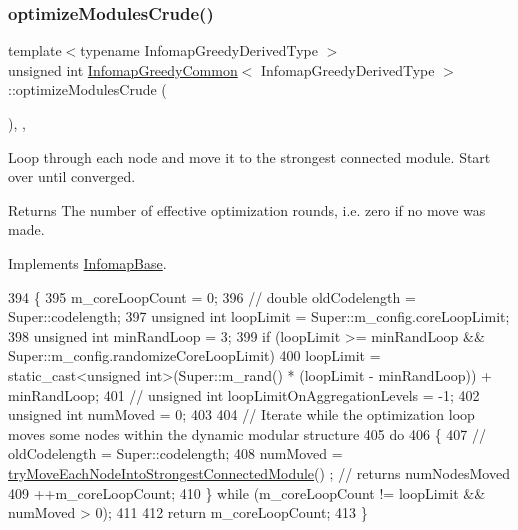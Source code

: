 \subsubsection{\texorpdfstring{optimize\+Modules\+Crude()}{optimizeModulesCrude()}}
{\footnotesize\ttfamily template$<$typename Infomap\+Greedy\+Derived\+Type $>$ \\
unsigned int \mbox{\hyperlink{classInfomapGreedyCommon}{Infomap\+Greedy\+Common}}$<$ Infomap\+Greedy\+Derived\+Type $>$\+::optimize\+Modules\+Crude (\begin{DoxyParamCaption}{ }\end{DoxyParamCaption})\hspace{0.3cm}{\ttfamily [inline]}, {\ttfamily [protected]}, {\ttfamily [virtual]}}

Loop through each node and move it to the strongest connected module. Start over until converged.

\begin{DoxyReturn}{Returns}
The number of effective optimization rounds, i.\+e. zero if no move was made. 
\end{DoxyReturn}


Implements \mbox{\hyperlink{classInfomapBase_acb6dc935567c31d7ada4b514c5b8dcea}{Infomap\+Base}}.


\begin{DoxyCode}
394 \{
395     m\_coreLoopCount = 0;
396     \textcolor{comment}{// double oldCodelength = Super::codelength;}
397     \textcolor{keywordtype}{unsigned} \textcolor{keywordtype}{int} loopLimit = Super::m\_config.coreLoopLimit;
398     \textcolor{keywordtype}{unsigned} \textcolor{keywordtype}{int} minRandLoop = 3;
399     \textcolor{keywordflow}{if} (loopLimit >= minRandLoop && Super::m\_config.randomizeCoreLoopLimit)
400         loopLimit = \textcolor{keyword}{static\_cast<}\textcolor{keywordtype}{unsigned} \textcolor{keywordtype}{int}\textcolor{keyword}{>}(Super::m\_rand() * (loopLimit - minRandLoop)) + minRandLoop;
401     \textcolor{comment}{// unsigned int loopLimitOnAggregationLevels = -1;}
402     \textcolor{keywordtype}{unsigned} \textcolor{keywordtype}{int} numMoved = 0;
403 
404     \textcolor{comment}{// Iterate while the optimization loop moves some nodes within the dynamic modular structure}
405     \textcolor{keywordflow}{do}
406     \{
407         \textcolor{comment}{// oldCodelength = Super::codelength;}
408         numMoved = \mbox{\hyperlink{classInfomapGreedyCommon_ac1026d8aaeb5a5ceeb6c272d6adba431}{tryMoveEachNodeIntoStrongestConnectedModule}}()
      ; \textcolor{comment}{// returns numNodesMoved}
409         ++m\_coreLoopCount;
410     \} \textcolor{keywordflow}{while} (m\_coreLoopCount != loopLimit && numMoved > 0);
411 
412     \textcolor{keywordflow}{return} m\_coreLoopCount;
413 \}
\end{DoxyCode}
\mbox{\label{classInfomapGreedyCommon_a25af363aae49138b379a823b6ab2ad5c}} 

